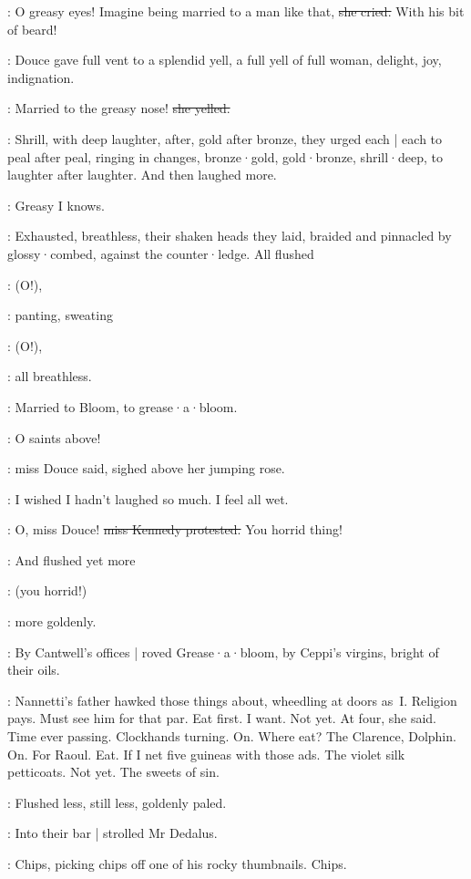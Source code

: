 \MissK:
O greasy eyes!
Imagine being married to a man like that,
\sout{she cried.}
With his bit
of beard!

:
Douce gave full vent to a splendid yell,
a full yell of full woman,
delight,
joy,
indignation.

\MissD:
Married to the greasy nose!
\sout{she yelled.}

:
Shrill,
with deep laughter,
after,
gold after bronze,
they urged each |
each to peal after peal,
ringing in changes,
bronze·gold,
gold·bronze,
shrill·deep,
to laughter after laughter.
And then laughed more.

\MissK:
Greasy I knows.

:
Exhausted,
breathless,
their shaken heads they laid,
braided and pinnacled by glossy·combed,
against the counter·ledge.
All flushed

\MissesDK:
(O!),

:
panting,
sweating

\MissesDK:
(O!),

:
all breathless.

:
Married to Bloom,
to grease·a·bloom.

\MissD:
O saints above!

:
miss Douce said,
sighed above her jumping rose.

\MissD:
I wished I hadn't laughed so much.
I feel all wet.

\MissK:
O, miss Douce!
\sout{miss Kennedy protested.}
You horrid thing!

:
And flushed yet more

\MissK:
(you horrid!)

:
more goldenly.

:
By Cantwell's offices |
roved Grease·a·bloom,
by Ceppi's virgins,
bright of their oils.

\BloomIntA:
Nannetti's father hawked those things about,
wheedling at doors as~I\@.
Religion pays.
Must see him for that par.
Eat first.
I want.
Not yet.
At four,
she said.
Time ever passing.
Clockhands turning.
On.
Where eat?
The Clarence,
Dolphin.
On.
For Raoul.
Eat.
If I net five guineas with those ads.
The violet silk petticoats.
Not yet.
The sweets of sin.

:
Flushed less,
still less,
goldenly paled.

:
Into their bar |
strolled Mr Dedalus.

:
Chips,
picking chips off one of his rocky thumbnails.
Chips.


